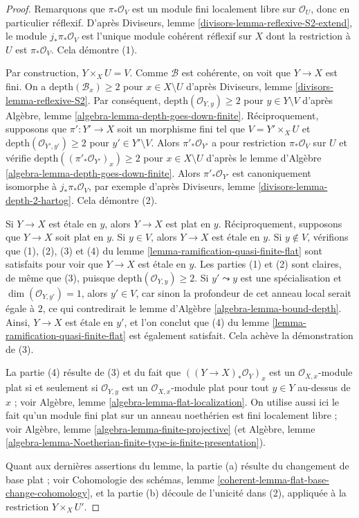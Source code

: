 \begin{proof}
Remarquons que $\pi_*\mathcal{O}_V$ est un module fini localement libre
sur $\mathcal{O}_U$, donc en particulier réflexif.
D'après Diviseurs, lemme \ref{divisors-lemma-reflexive-S2-extend},
le module $j_*\pi_*\mathcal{O}_V$ est l'unique
module cohérent réflexif sur $X$ dont la restriction à $U$
est $\pi_*\mathcal{O}_V$. Cela démontre (1).

\medskip\noindent
Par construction, $Y \times_X U = V$.
Comme $\mathcal{B}$ est cohérente, on voit que $Y \to X$ est fini.
On a $\text{depth}(\mathcal{B}_x) \geq 2$ pour $x \in X \setminus U$
d'après Diviseurs, lemme \ref{divisors-lemma-reflexive-S2}.
Par conséquent, $\text{depth}(\mathcal{O}_{Y, y}) \geq 2$ pour $y \in Y \setminus V$
d'après Algèbre, lemme \ref{algebra-lemma-depth-goes-down-finite}.
Réciproquement, supposons que $\pi' : Y' \to X$ soit un morphisme fini tel que
$V = Y' \times_X U$ et $\text{depth}(\mathcal{O}_{Y', y'}) \geq 2$
pour $y' \in Y' \setminus V$. Alors $\pi'_*\mathcal{O}_{Y'}$
a pour restriction $\pi_*\mathcal{O}_V$ sur $U$ et vérifie
$\text{depth}((\pi'_*\mathcal{O}_{Y'})_x) \geq 2$ pour
$x \in X \setminus U$ d'après le
lemme d'Algèbre \ref{algebra-lemma-depth-goes-down-finite}.
Alors $\pi'_*\mathcal{O}_{Y'}$ est canoniquement isomorphe
à $j_*\pi_*\mathcal{O}_V$, par exemple d'après
Diviseurs, lemme \ref{divisors-lemma-depth-2-hartog}.
Cela démontre (2).

\medskip\noindent
Si $Y \to X$ est étale en $y$, alors $Y \to X$ est plat en $y$.
Réciproquement, supposons que $Y \to X$ soit plat en $y$.
Si $y \in V$, alors $Y \to X$ est étale en $y$.
Si $y \not \in V$, vérifions que (1), (2), (3) et (4) du
lemme \ref{lemma-ramification-quasi-finite-flat} sont satisfaits
pour voir que $Y \to X$ est étale en $y$. Les parties (1) et (2)
sont claires, de même que (3), puisque $\text{depth}(\mathcal{O}_{Y, y}) \geq 2$.
Si $y' \leadsto y$ est une spécialisation et $\dim(\mathcal{O}_{Y, y'}) = 1$,
alors $y' \in V$, car sinon la profondeur de cet anneau local
serait égale à $2$, ce qui contredirait le
lemme d'Algèbre \ref{algebra-lemma-bound-depth}.
Ainsi, $Y \to X$ est étale en $y'$, et l'on conclut que (4) du
lemme \ref{lemma-ramification-quasi-finite-flat} est également satisfait.
Cela achève la démonstration de (3).

\medskip\noindent
La partie (4) résulte de (3) et du fait que $((Y \to X)_*\mathcal{O}_Y)_x$
est un $\mathcal{O}_{X, x}$-module plat si et seulement si $\mathcal{O}_{Y, y}$
est un $\mathcal{O}_{X, x}$-module plat pour tout $y \in Y$ au-dessus de $x$ ; voir
Algèbre, lemme \ref{algebra-lemma-flat-localization}. On utilise aussi ici
le fait qu'un module fini plat sur un anneau noethérien est fini localement
libre ; voir Algèbre, lemme \ref{algebra-lemma-finite-projective}
(et
Algèbre, lemme
\ref{algebra-lemma-Noetherian-finite-type-is-finite-presentation}).

\medskip\noindent
Quant aux dernières assertions du lemme, la partie (a) résulte du
changement de base plat ; voir
Cohomologie des schémas, lemme \ref{coherent-lemma-flat-base-change-cohomology},
et la partie (b) découle de l'unicité dans (2), appliquée à la restriction
$Y \times_X U'$.
\end{proof}

